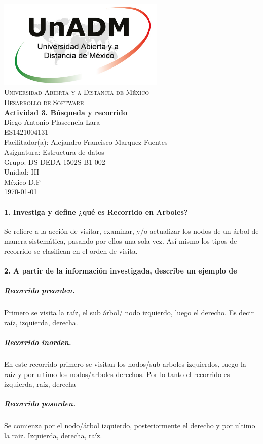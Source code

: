 \documentclass[spanish,12pt,letterpapper]{article}
\begin{document}
	\begin{titlepage}
		\begin{center}
			\includegraphics[width=0.6\textwidth]{../logoUnADM}~\\[1cm] 
			\textsc{Universidad Abierta y a Distancia de M\'exico}\\[0.8cm]
			\textsc{Desarrollo de Software}\\[1.8cm]
			
			\textbf{ \Large Actividad 3. Búsqueda y recorrido}\\[3cm]
			
			Diego Antonio Plascencia Lara\\ ES1421004131 \\[0.4cm]
			Facilitador(a): Alejandro Francisco Marquez Fuentes\\
			Asignatura: Estructura de datos\\
			Grupo: DS-DEDA-1502S-B1-002 \\
			Unidad: III \\
			
			\vfill M\'exico D.F\\{\today}
			
		\end{center}
	\end{titlepage}
	
	\paragraph{1. Investiga y define ¿qué es Recorrido en Arboles?\\}
	
	Se refiere a la acción de visitar, examinar, y/o actualizar los nodos de un árbol de manera sistemática, pasando por ellos una sola vez. Así mismo los tipos de recorrido se clasifican en el orden de visita.
	
	\paragraph{2. A partir de la información investigada, describe un ejemplo de\\}
	\subparagraph{Recorrido preorden. } Primero se visita la raíz, el sub árbol/ nodo izquierdo, luego el derecho. Es decir raíz, izquierda, derecha. 
	\subparagraph{Recorrido inorden. } En este recorrido primero se visitan los nodos/sub arboles izquierdos, luego la raíz y por ultimo los nodos/arboles derechos. Por lo tanto el recorrido es izquierda, raíz, derecha
	\subparagraph{Recorrido posorden. } Se comienza por el nodo/árbol izquierdo, posteriormente el derecho y por ultimo la raiz. Izquierda, derecha, raíz. 
	
\end{document}
